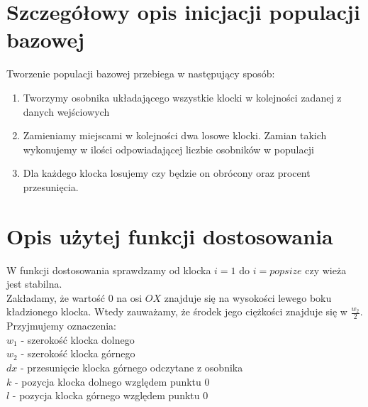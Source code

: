 \documentclass[12pt,a4paper]{article}
\begin{document}
\section{Szczegółowy opis inicjacji populacji bazowej}
Tworzenie populacji bazowej przebiega w następujący sposób:
\begin{enumerate}
\item Tworzymy osobnika układającego wszystkie klocki w kolejności zadanej z danych wejściowych
\item Zamieniamy miejscami w kolejności dwa losowe klocki. Zamian takich wykonujemy w ilości odpowiadającej liczbie osobników w populacji
\item Dla każdego klocka losujemy czy będzie on obrócony oraz procent przesunięcia.
\end{enumerate}
\section{Opis użytej funkcji dostosowania}
W funkcji dostosowania sprawdzamy od klocka $i=1$ do $i=popsize$ czy wieża jest stabilna.\\
Zakładamy, że wartość $0$ na osi $OX$ znajduje się na wysokości lewego boku kładzionego klocka. Wtedy zauważamy, że środek jego ciężkości znajduje się w $\frac{w_2}{2}$.\\
Przyjmujemy oznaczenia:\\
$w_1$ - szerokość klocka dolnego\\
$w_2$ - szerokość klocka górnego\\
$dx$ - przesunięcie klocka górnego odczytane z osobnika\\
$k$ - pozycja klocka dolnego względem punktu $0$\\
$l$ - pozycja klocka górnego względem punktu $0$\\
\end{document}

